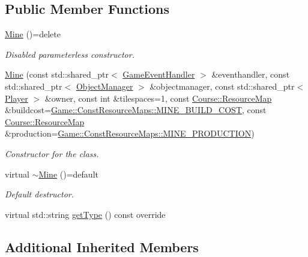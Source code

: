 \subsection*{Public Member Functions}
\begin{DoxyCompactItemize}
\item 
\hyperlink{classGame_1_1Mine_a052f5f30bddf99dfeb2d5a250f052571}{Mine} ()=delete
\begin{DoxyCompactList}\small\item\em Disabled parameterless constructor. \end{DoxyCompactList}\item 
\hyperlink{classGame_1_1Mine_a47b233fda9aeb633a0de2e72c6030f1b}{Mine} (const std\-::shared\-\_\-ptr$<$ \hyperlink{classGame_1_1GameEventHandler}{Game\-Event\-Handler} $>$ \&eventhandler, const std\-::shared\-\_\-ptr$<$ \hyperlink{classGame_1_1ObjectManager}{Object\-Manager} $>$ \&objectmanager, const std\-::shared\-\_\-ptr$<$ \hyperlink{classGame_1_1Player}{Player} $>$ \&owner, const int \&tilespaces=1, const \hyperlink{namespaceCourse_ab9a46ed9cd00485e318e5731ea2f78d9}{Course\-::\-Resource\-Map} \&buildcost=\hyperlink{namespaceGame_1_1ConstResourceMaps_adda0aad5b2188a57d2d187f692e2c2f9}{Game\-::\-Const\-Resource\-Maps\-::\-M\-I\-N\-E\-\_\-\-B\-U\-I\-L\-D\-\_\-\-C\-O\-S\-T}, const \hyperlink{namespaceCourse_ab9a46ed9cd00485e318e5731ea2f78d9}{Course\-::\-Resource\-Map} \&production=\hyperlink{namespaceGame_1_1ConstResourceMaps_ad58736a7028bf9bdd46583af4cb3d410}{Game\-::\-Const\-Resource\-Maps\-::\-M\-I\-N\-E\-\_\-\-P\-R\-O\-D\-U\-C\-T\-I\-O\-N})
\begin{DoxyCompactList}\small\item\em Constructor for the class. \end{DoxyCompactList}\item 
virtual \hyperlink{classGame_1_1Mine_a418dd7de3691b762b7373e5f39a111c9}{$\sim$\-Mine} ()=default
\begin{DoxyCompactList}\small\item\em Default destructor. \end{DoxyCompactList}\item 
virtual std\-::string \hyperlink{classGame_1_1Mine_aaf18e426d1978c8e6f0cf0dc7435c257}{get\-Type} () const override
\end{DoxyCompactItemize}
\subsection*{Additional Inherited Members}



